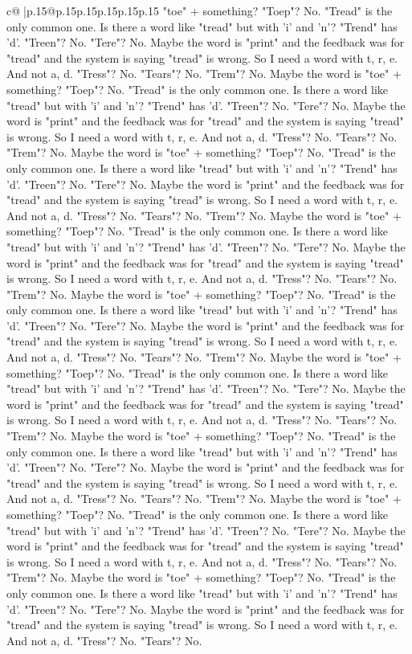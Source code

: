 \documentclass{article}
\begin{document}
{\begin{supertabular}{c@{$\;$}|p{.15\linewidth}@{}p{.15\linewidth}p{.15\linewidth}p{.15\linewidth}p{.15\linewidth}p{.15\linewidth}}
{{{"toe" + something? "Toep"? No. "Tread" is the only common one. Is there a word like "tread" but with 'i' and 'n'? "Trend" has 'd'. "Treen"? No. "Tere"? No. Maybe the word is "print" and the feedback was for "tread" and the system is saying "tread" is wrong. So I need a word with t, r, e. And not a, d. "Tress"? No. "Tears"? No. "Trem"? No. Maybe the word is "toe" + something? "Toep"? No. "Tread" is the only common one. Is there a word like "tread" but with 'i' and 'n'? "Trend" has 'd'. "Treen"? No. "Tere"? No. Maybe the word is "print" and the feedback was for "tread" and the system is saying "tread" is wrong. So I need a word with t, r, e. And not a, d. "Tress"? No. "Tears"? No. "Trem"? No. Maybe the word is "toe" + something? "Toep"? No. "Tread" is the only common one. Is there a word like "tread" but with 'i' and 'n'? "Trend" has 'd'. "Treen"? No. "Tere"? No. Maybe the word is "print" and the feedback was for "tread" and the system is saying "tread" is wrong. So I need a word with t, r, e. And not a, d. "Tress"? No. "Tears"? No. "Trem"? No. Maybe the word is "toe" + something? "Toep"? No. "Tread" is the only common one. Is there a word like "tread" but with 'i' and 'n'? "Trend" has 'd'. "Treen"? No. "Tere"? No. Maybe the word is "print" and the feedback was for "tread" and the system is saying "tread" is wrong. So I need a word with t, r, e. And not a, d. "Tress"? No. "Tears"? No. "Trem"? No. Maybe the word is "toe" + something? "Toep"? No. "Tread" is the only common one. Is there a word like "tread" but with 'i' and 'n'? "Trend" has 'd'. "Treen"? No. "Tere"? No. Maybe the word is "print" and the feedback was for "tread" and the system is saying "tread" is wrong. So I need a word with t, r, e. And not a, d. "Tress"? No. "Tears"? No. "Trem"? No. Maybe the word is "toe" + something? "Toep"? No. "Tread" is the only common one. Is there a word like "tread" but with 'i' and 'n'? "Trend" has 'd'. "Treen"? No. "Tere"? No. Maybe the word is "print" and the feedback was for "tread" and the system is saying "tread" is wrong. So I need a word with t, r, e. And not a, d. "Tress"? No. "Tears"? No. "Trem"? No. Maybe the word is "toe" + something? "Toep"? No. "Tread" is the only common one. Is there a word like "tread" but with 'i' and 'n'? "Trend" has 'd'. "Treen"? No. "Tere"? No. Maybe the word is "print" and the feedback was for "tread" and the system is saying "tread" is wrong. So I need a word with t, r, e. And not a, d. "Tress"? No. "Tears"? No. "Trem"? No. Maybe the word is "toe" + something? "Toep"? No. "Tread" is the only common one. Is there a word like "tread" but with 'i' and 'n'? "Trend" has 'd'. "Treen"? No. "Tere"? No. Maybe the word is "print" and the feedback was for "tread" and the system is saying "tread" is wrong. So I need a word with t, r, e. And not a, d. "Tress"? No. "Tears"? No. "Trem"? No. Maybe the word is "toe" + something? "Toep"? No. "Tread" is the only common one. Is there a word like "tread" but with 'i' and 'n'? "Trend" has 'd'. "Treen"? No. "Tere"? No. Maybe the word is "print" and the feedback was for "tread" and the system is saying "tread" is wrong. So I need a word with t, r, e. And not a, d. "Tress"? No. "Tears"? No. }}}
\end{supertabular}}
\end{document}

